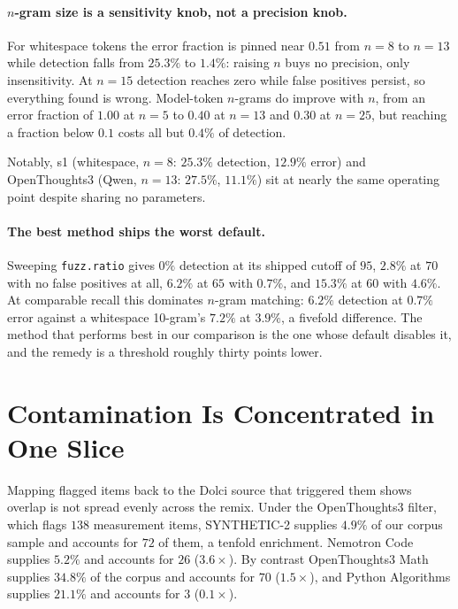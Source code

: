 \documentclass[11pt]{article}
\begin{document}
\paragraph{$n$-gram size is a sensitivity knob, not a precision knob.}
For whitespace tokens the error fraction is pinned near $0.51$ from $n{=}8$ to
$n{=}13$ while detection falls from $25.3\%$ to $1.4\%$: raising $n$ buys no
precision, only insensitivity. At $n{=}15$ detection reaches zero while false
positives persist, so everything found is wrong. Model-token $n$-grams do improve
with $n$, from an error fraction of $1.00$ at $n{=}5$ to $0.40$ at $n{=}13$ and
$0.30$ at $n{=}25$, but reaching a fraction below $0.1$ costs all but $0.4\%$ of
detection.

Notably, s1 (whitespace, $n{=}8$: $25.3\%$ detection, $12.9\%$ error) and
OpenThoughts3 (Qwen, $n{=}13$: $27.5\%$, $11.1\%$) sit at nearly the same
operating point despite sharing no parameters.

\paragraph{The best method ships the worst default.}
Sweeping \texttt{fuzz.ratio} gives $0\%$ detection at its shipped cutoff of $95$,
$2.8\%$ at $70$ with no false positives at all, $6.2\%$ at $65$ with $0.7\%$, and
$15.3\%$ at $60$ with $4.6\%$. At comparable recall this dominates $n$-gram
matching: $6.2\%$ detection at $0.7\%$ error against a whitespace 10-gram's
$7.2\%$ at $3.9\%$, a fivefold difference. The method that performs best in our
comparison is the one whose default disables it, and the remedy is a threshold
roughly thirty points lower.

\section{Contamination Is Concentrated in One Slice}
\label{sec:composition}

Mapping flagged items back to the Dolci source that triggered them shows overlap
is not spread evenly across the remix. Under the OpenThoughts3 filter, which flags
$138$ measurement items, SYNTHETIC-2 supplies $4.9\%$ of our corpus sample and
accounts for $72$ of them, a tenfold enrichment. Nemotron Code supplies $5.2\%$
and accounts for $26$ ($3.6\times$). By contrast OpenThoughts3 Math supplies
$34.8\%$ of the corpus and accounts for $70$ ($1.5\times$), and Python Algorithms
supplies $21.1\%$ and accounts for $3$ ($0.1\times$).
\end{document}
